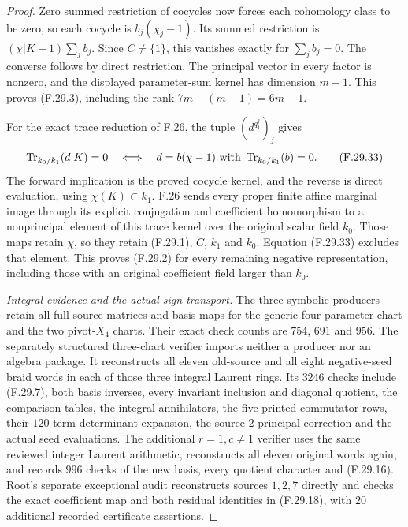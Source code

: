 \begin{proof}
Zero summed restriction of cocycles now
forces each cohomology class to be zero,
so each cocycle is $b_j(\chi_j-1)$.
Its summed restriction is
$(\chi|K-1)\sum_jb_j$. Since $C\ne\{1\}$,
this vanishes exactly for $\sum_jb_j=0$.
The converse follows by direct restriction.
The principal vector in every factor is
nonzero, and the displayed parameter-sum
kernel has dimension $m-1$.
This proves (F.29.3), including the rank
$7m-(m-1)=6m+1$.

For the exact trace reduction of F.26, the
tuple $(d^{q_1^j})_j$ gives
\[
 \operatorname{Tr}_{k_0/k_1}(d|K)=0
 \quad\Longleftrightarrow\quad
 d=b(\chi-1)\ \hbox{with}\ \operatorname{Tr}_{k_0/k_1}(b)=0.
                                                               \tag{F.29.33}
\]
The forward implication is the proved cocycle
kernel, and the reverse is direct evaluation,
using $\chi(K)\subset k_1$.
F.26 sends every proper finite affine marginal
image through its explicit conjugation and
coefficient homomorphism to a nonprincipal
element of this trace kernel over the original
scalar field $k_0$. Those maps retain $\chi$,
so they retain (F.29.1), $C$, $k_1$ and $k_0$.
Equation (F.29.33) excludes that element.
This proves (F.29.2) for every remaining
negative representation, including those
with an original coefficient field larger
than $k_0$.

\emph{Integral evidence and the actual sign transport.}
The three symbolic producers retain all full
source matrices and basis maps for the generic
four-parameter chart and the two pivot-$X_4$
charts. Their exact check counts are $754$,
$691$ and $956$.
The separately structured three-chart verifier
imports neither a producer nor an algebra
package. It reconstructs all eleven old-source
and all eight negative-seed braid words in
each of those three integral Laurent rings.
Its $3246$ checks include (F.29.7), both basis
inverses, every invariant inclusion and diagonal
quotient, the comparison tables, the integral
annihilators, the five printed commutator rows,
their $120$-term determinant expansion, the
source-$2$ principal correction and the actual
seed evaluations.
The additional $r=1,c\ne1$ verifier uses the
same reviewed integer Laurent arithmetic,
reconstructs all eleven original words again,
and records $996$ checks of the new basis,
every quotient character and (F.29.16).
Root's separate exceptional audit reconstructs
sources $1,2,7$ directly and checks the exact
coefficient map and both residual identities
in (F.29.18), with $20$ additional recorded
certificate assertions.


\end{proof}
